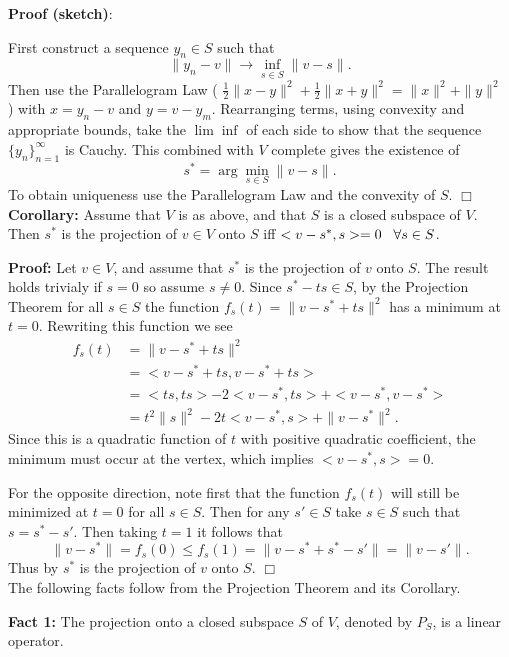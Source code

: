 \documentclass[12pt,oneside]{article}
\begin{document}
\textbf{Proof (sketch)}: 
 
 First construct a sequence \(y_n \in S\) such that 
\[\| y_n-v\| \to \inf\limits_{s\in S} \|v-s\|.\] 
Then use the Parallelogram Law ( \( \frac{1}{2} \|x-y\|^2 +\frac{1}{2} \|x+y\|^2=\|x\|^2+\|y\|^2 \) ) with \(x=y_n -v\) and \(y=v-y_m\). Rearranging terms, using convexity and appropriate bounds, take the \( \lim\inf \) of each side to show that the sequence \( \{y_n\}_{n=1}^{\infty} \) is Cauchy. This combined with \(V\) complete gives the existence of 
\[
s^*=\arg\min\limits_{s\in S} \|v-s\|.
\]
To obtain uniqueness use the Parallelogram Law and the convexity of \(S\).    \(\Box\)\\

\noindent \textbf{Corollary:} Assume that \(V\) is as above, and that \( S \) is a closed subspace of \(V\). Then \( s^* \) is the projection of \( v \in V\) onto \(S\) iff \(<v-s^*, s>=0  \hspace{3mm}\forall s \in S \). 

\textbf{Proof:} Let \(v\in V\), and assume that \( s^*\) is the projection of \(v\) onto \(S\). The result holds trivialy if \(s=0\) so assume \(s\ne 0\). Since $s^*-ts\in S$, by the Projection Theorem for all \(s\in S\) the function \( f_s(t) = \| v-s^*+ts\|^2 \) has a minimum at \(t=0\). Rewriting this function we see 
\begin{align*}
 f_s(t) & = \| v-s^*+ts\|^2 \\
& =<v-s^*+ts, v-s^*+ts> \\
& = <ts,ts> -2 <v-s^*,ts> + <v-s^*,v-s^*> \\
&=t^2 \|s\|^2 -2t<v-s^*,s> + \|v-s^*\|^2.
\end{align*} 
Since this is a quadratic function of \(t\) with positive quadratic coefficient, the minimum must occur at the vertex, which implies \( <v-s^*,s>=0\). 

For the opposite direction, note first that the function \(f_s(t)\) will still be minimized at \(t=0\) for all \(s \in S\). Then for any \( s' \in S\) take \(s \in S \) such that \( s=s^*-s'\). Then taking \(t=1\) it follows that 
\[
\|v-s^*\|=f_s(0) \le f_s(1)=\|v-s^*+s^*-s'\|=\|v-s'\|.
\]
Thus by \(s^*\) is the projection of \(v\) onto  \(S\). \( \Box \) \\

The following facts follow from the Projection Theorem and its Corollary. 

\noindent\textbf{Fact 1:} The projection onto a closed subspace \(S \) of \(V\), denoted by \(P_S\), is a linear operator.
\end{document}

